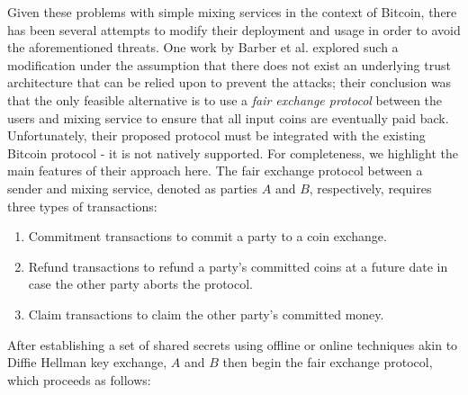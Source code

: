 Given these problems with simple mixing services in the context of Bitcoin, there has been several attempts to modify their deployment and usage in order to avoid the aforementioned threats. One work by Barber et al. \cite{BetterToBitter} explored such a modification under the assumption that there does not exist an underlying trust architecture that can be relied upon to prevent the attacks; their conclusion was that the only feasible alternative is to use a \emph{fair exchange protocol} between the users and mixing service to ensure that all input coins are eventually paid back. Unfortunately, their proposed protocol must be integrated with the existing Bitcoin protocol - it is not natively supported. For completeness, we highlight the main features of their approach here. The fair exchange protocol between a sender and mixing service, denoted as parties $A$ and $B$, respectively, requires three types of transactions:
\begin{enumerate}
	\item Commitment transactions to commit a party to a coin exchange.
	\item Refund transactions to refund a party's committed coins at a future date in case the other party aborts the protocol.
	\item Claim transactions to claim the other party's committed money. 
\end{enumerate}
After establishing a set of shared secrets using offline or online techniques akin to Diffie Hellman key exchange, $A$ and $B$ then begin the fair exchange protocol, which proceeds as follows:
